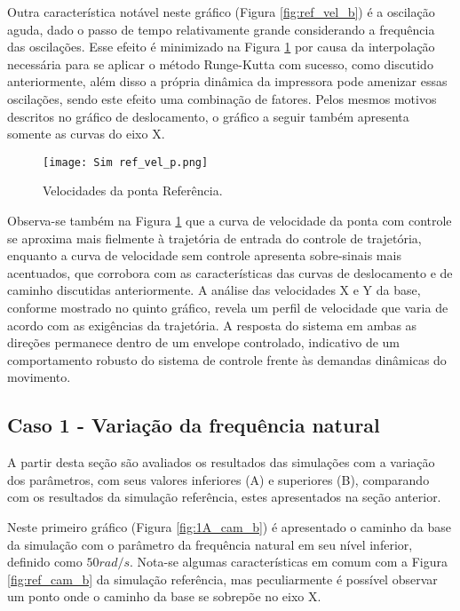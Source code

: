 Outra característica notável neste gráfico (Figura \ref{fig:ref_vel_b}) é a oscilação aguda, dado o passo de tempo relativamente grande considerando a frequência das oscilações. Esse efeito é minimizado na Figura \ref{fig:ref_vel_p} por causa da interpolação necessária para se aplicar o método Runge-Kutta com sucesso, como discutido anteriormente, além disso a própria dinâmica da impressora pode amenizar essas oscilações, sendo este efeito uma combinação de fatores. Pelos mesmos motivos descritos no gráfico de deslocamento, o gráfico a seguir também apresenta somente as curvas do eixo X. 

\begin{figure}[H]
    \centering
    \caption{Velocidades da ponta Referência.}
    \texttt{[image: Sim ref\_vel\_p.png]}

    \label{fig:ref_vel_p}
\end{figure}

Observa-se também na Figura \ref{fig:ref_vel_p} que a curva de velocidade da ponta com controle se aproxima mais fielmente à trajetória de entrada do controle de trajetória, enquanto a curva de velocidade sem controle apresenta sobre-sinais mais acentuados, que corrobora com as características das curvas de deslocamento e de caminho discutidas anteriormente.
A análise das velocidades X e Y da base, conforme mostrado no quinto gráfico, revela um perfil de velocidade que varia de acordo com as exigências da trajetória. A resposta do sistema em ambas as direções permanece dentro de um envelope controlado, indicativo de um comportamento robusto do sistema de controle frente às demandas dinâmicas do movimento.

\subsection{Caso 1 - Variação da frequência natural}
A partir desta seção são avaliados os resultados das simulações com a variação dos parâmetros, com seus valores inferiores (A) e superiores (B), comparando com os resultados da simulação referência, estes apresentados na seção anterior.

Neste primeiro gráfico (Figura \ref{fig:1A_cam_b}) é apresentado o caminho da base da simulação com o parâmetro da frequência natural em seu nível inferior, definido como \(50 rad/s\). Nota-se algumas características em comum com a Figura \ref{fig:ref_cam_b} da simulação referência, mas peculiarmente é possível observar um ponto onde o caminho da base se sobrepõe no eixo X.

